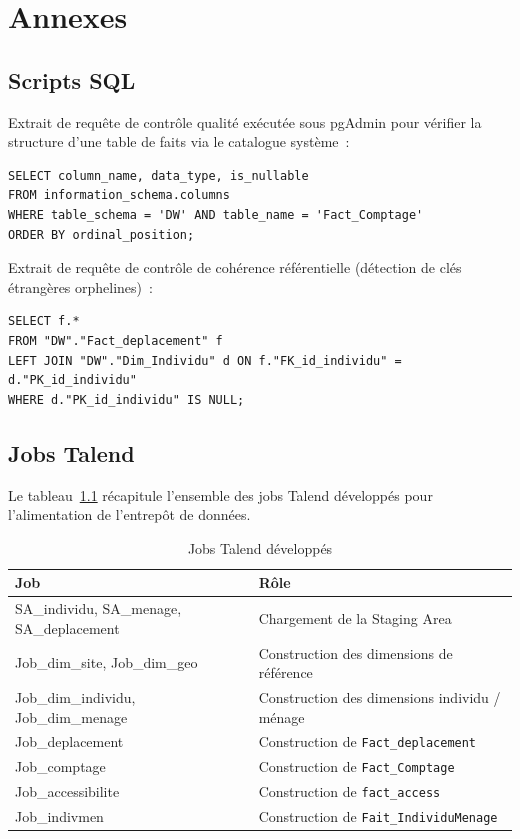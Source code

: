 \chapter{Annexes}

\section{Scripts SQL}
Extrait de requête de contrôle qualité exécutée sous pgAdmin pour vérifier la structure d'une table de faits via le catalogue système~:
\begin{verbatim}
SELECT column_name, data_type, is_nullable
FROM information_schema.columns
WHERE table_schema = 'DW' AND table_name = 'Fact_Comptage'
ORDER BY ordinal_position;
\end{verbatim}

Extrait de requête de contrôle de cohérence référentielle (détection de clés étrangères orphelines)~:
\begin{verbatim}
SELECT f.*
FROM "DW"."Fact_deplacement" f
LEFT JOIN "DW"."Dim_Individu" d ON f."FK_id_individu" = d."PK_id_individu"
WHERE d."PK_id_individu" IS NULL;
\end{verbatim}

\section{Jobs Talend}
Le tableau~\ref{tab:talend_jobs_annexe} récapitule l'ensemble des jobs Talend développés pour l'alimentation de l'entrepôt de données.

\begin{table}[H]
\centering
\caption{Jobs Talend développés}
\label{tab:talend_jobs_annexe}
\begin{tabular}{ll}
\toprule
\textbf{Job} & \textbf{Rôle} \\
\midrule
SA\_individu, SA\_menage, SA\_deplacement & Chargement de la Staging Area \\
Job\_dim\_site, Job\_dim\_geo & Construction des dimensions de référence \\
Job\_dim\_individu, Job\_dim\_menage & Construction des dimensions individu / ménage \\
Job\_deplacement & Construction de \texttt{Fact\_deplacement} \\
Job\_comptage & Construction de \texttt{Fact\_Comptage} \\
Job\_accessibilite & Construction de \texttt{fact\_access} \\
Job\_indivmen & Construction de \texttt{Fait\_IndividuMenage} \\
\bottomrule
\end{tabular}
\end{table}

